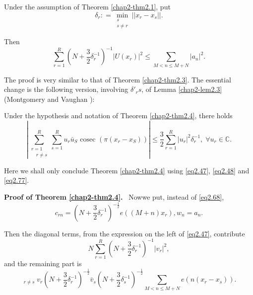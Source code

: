 \begin{theorem}\label{chap2-thm2.4}%
Under the assumption of Theorem \ref{chap2-thm2.1}, put
\begin{equation*}
\delta_r : = \min_{\substack{s\\ s \neq r}}||x_r-x_s||. \tag{2.75}\label{eq2.75}
\end{equation*}
\end{theorem}

Then
\begin{equation*}
\sum_{r=1}^{R}(N+\frac{3}{2}\delta_r^{-1})^{-1}|U(x_r)|^{2} \leq
\sum_{M < n \leq M+N}|a_n|^2. \tag{2.76}\label{eq2.76} 
\end{equation*}

The proof is very similar to that of Theorem \ref{chap2-thm2.3}. The
essential change is the following version, involving $\delta'_r s$, of Lemma
\ref{chap2-lem2.3} (Montgomery and Vaughan \cite{key1}): 

\begin{lemma}\label{chap2-lem2.4}%
Under the hypothesis and notation of Theorem \ref{chap2-thm2.4}, there
holds 
\begin{equation*}
| \sum^{R}_{\substack{r=1\\ \quad r \neq s}} \sum_{s=1}^{R}u_r
\bar{u}_S \text { cosec }(\pi (x_r-x_S))| \leq \frac{3}{2}
\sum^{R}_{r=1}|u_r |^2 \delta^{-1}_r,  \; \forall u_r \in
\mathbb{C}. \tag{2.77}\label{eq2.77}  
\end{equation*}
\end{lemma}

Here we shall only conclude Theorem \ref{chap2-thm2.4} using
\eqref{eq2.47}, \eqref{eq2.48} and \eqref{eq2.77}. 

\medskip
\noindent
\textbf{Proof of Theorem \ref{chap2-thm2.4}.}~ Now\pageoriginale we
put, instead of \eqref{eq2.68}, 
\begin{equation*}
c_{rn}=(N+\frac{3}{2}\delta_r^{-1})^{-\frac{1}{2}}e((M+n)x_r), w_n  =
a_n. \tag{2.78}\label{eq2.78} 
\end{equation*}

Then the diagonal terms, from the expression on the left of
\eqref{eq2.47}, contribute 
\begin{equation*}
N \sum_{r=1}^{R}(N+\frac{3}{2}\delta_r^{-1})^{-1}|v_r|^2, \tag{2.79}\label{eq2.79}
\end{equation*}
and the remaining part is
\begin{equation*}
\mathop{\sum_{r=1}^{R} \sum_{s=1}^{R}}_{r\neq s} v_r(N +
\frac{3}{2}\delta_r^{-1})^{-\frac{1}{2}} \bar{v}_s(N +
\frac{3}{2}\delta_s^{-1})^{-\frac{1}{2}} \sum_{M < n \leq M+N}
e(n(x_r-x_s)). \tag{2.80}\label{eq2.80} 
\end{equation*}

